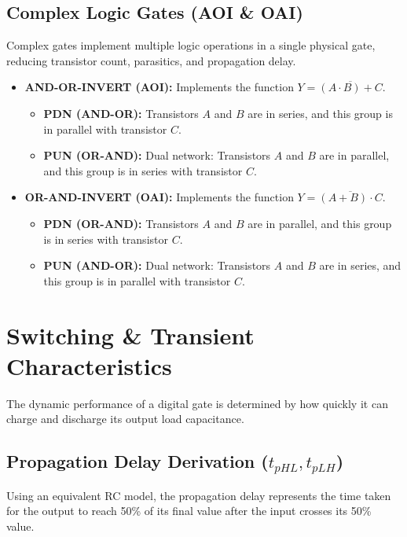 \documentclass[12pt,a4paper]{article}
\begin{document}
\subsection{Complex Logic Gates (AOI \& OAI)}
Complex gates implement multiple logic operations in a single physical gate, reducing transistor count, parasitics, and propagation delay.
\begin{itemize}[leftmargin=*, itemsep=3.5pt]
  \item \textbf{AND-OR-INVERT (AOI):} Implements the function $Y = \overline{(A \cdot B) + C}$.
    \begin{itemize}
      \item \textbf{PDN (AND-OR):} Transistors $A$ and $B$ are in series, and this group is in parallel with transistor $C$.
      \item \textbf{PUN (OR-AND):} Dual network: Transistors $A$ and $B$ are in parallel, and this group is in series with transistor $C$.
    \end{itemize}
  \item \textbf{OR-AND-INVERT (OAI):} Implements the function $Y = \overline{(A + B) \cdot C}$.
    \begin{itemize}
      \item \textbf{PDN (OR-AND):} Transistors $A$ and $B$ are in parallel, and this group is in series with transistor $C$.
      \item \textbf{PUN (AND-OR):} Dual network: Transistors $A$ and $B$ are in series, and this group is in parallel with transistor $C$.
    \end{itemize}
\end{itemize}

\section{Switching \& Transient Characteristics}

The dynamic performance of a digital gate is determined by how quickly it can charge and discharge its output load capacitance.

\subsection{Propagation Delay Derivation ($t_{pHL}, t_{pLH}$)}
Using an equivalent RC model, the propagation delay represents the time taken for the output to reach 50\% of its final value after the input crosses its 50\% value.
\end{document}
